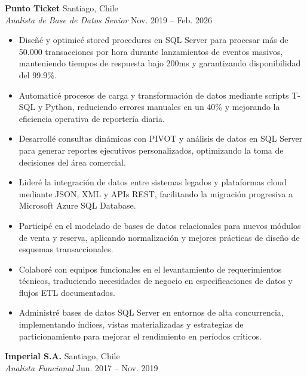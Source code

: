 \documentclass[11pt,letterpaper]{article}
\begin{document}
\textbf{Punto Ticket} \hfill Santiago, Chile\\
\textit{Analista de Base de Datos Senior} \hfill Nov. 2019 – Feb. 2026
\begin{itemize}
  \item Diseñé y optimicé stored procedures en SQL Server para procesar más de 50.000 transacciones por hora durante lanzamientos de eventos masivos, manteniendo tiempos de respuesta bajo 200ms y garantizando disponibilidad del 99.9\%.
  \item Automaticé procesos de carga y transformación de datos mediante scripts T-SQL y Python, reduciendo errores manuales en un 40\% y mejorando la eficiencia operativa de reportería diaria.
  \item Desarrollé consultas dinámicas con PIVOT y análisis de datos en SQL Server para generar reportes ejecutivos personalizados, optimizando la toma de decisiones del área comercial.
  \item Lideré la integración de datos entre sistemas legados y plataformas cloud mediante JSON, XML y APIs REST, facilitando la migración progresiva a Microsoft Azure SQL Database.
  \item Participé en el modelado de bases de datos relacionales para nuevos módulos de venta y reserva, aplicando normalización y mejores prácticas de diseño de esquemas transaccionales.
  \item Colaboré con equipos funcionales en el levantamiento de requerimientos técnicos, traduciendo necesidades de negocio en especificaciones de datos y flujos ETL documentados.
  \item Administré bases de datos SQL Server en entornos de alta concurrencia, implementando índices, vistas materializadas y estrategias de particionamiento para mejorar el rendimiento en períodos críticos.
\end{itemize}
\vspace{2pt}
\textbf{Imperial S.A.} \hfill Santiago, Chile\\
\textit{Analista Funcional} \hfill Jun. 2017 – Nov. 2019
\end{document}
